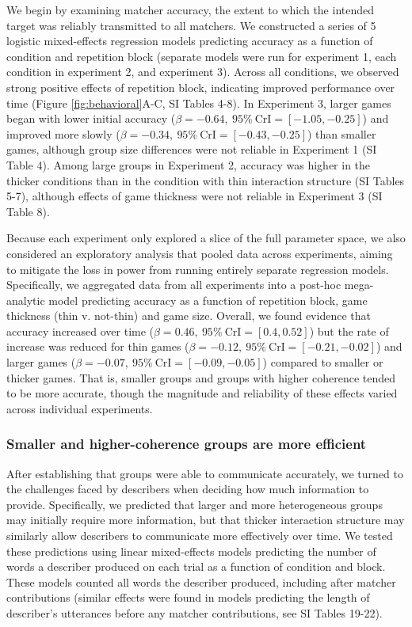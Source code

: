 \documentclass[
  english,
]{article}
\begin{document}
We begin by examining matcher accuracy, the extent to which the intended target was reliably transmitted to all matchers.
We constructed a series of 5 logistic mixed-effects regression models predicting accuracy as a function of condition and repetition block (separate models were run for experiment 1, each condition in experiment 2, and experiment 3).
Across all conditions, we observed strong positive effects of repetition block, indicating improved performance over time (Figure \ref{fig:behavioral}A-C, SI Tables 4-8).
In Experiment 3, larger games began with lower initial accuracy (\(\beta=-0.64,\:95\%\:\mathrm{CrI}=[-1.05, -0.25]\)) and improved more slowly (\(\beta=-0.34,\:95\%\:\mathrm{CrI}=[-0.43, -0.25]\)) than smaller games, although group size differences were not reliable in Experiment 1 (SI Table 4).
Among large groups in Experiment 2, accuracy was higher in the thicker conditions than in the condition with thin interaction structure (SI Tables 5-7), although effects of game thickness were not reliable in Experiment 3 (SI Table 8).

Because each experiment only explored a slice of the full parameter space, we also considered an exploratory analysis that pooled data across experiments, aiming to mitigate the loss in power from running entirely separate regression models.
Specifically, we aggregated data from all experiments into a post-hoc mega-analytic model predicting accuracy as a function of repetition block, game thickness (thin v. not-thin) and game size.
Overall, we found evidence that accuracy increased over time (\(\beta=0.46,\:95\%\:\mathrm{CrI}=[0.4, 0.52]\)) but the rate of increase was reduced for thin games (\(\beta=-0.12,\:95\%\:\mathrm{CrI}=[-0.21, -0.02]\)) and larger games (\(\beta=-0.07,\:95\%\:\mathrm{CrI}=[-0.09, -0.05]\)) compared to smaller or thicker games.
That is, smaller groups and groups with higher coherence tended to be more accurate, though the magnitude and reliability of these effects varied across individual experiments.

\subsubsection{Smaller and higher-coherence groups are more efficient}\label{smaller-and-higher-coherence-groups-are-more-efficient}

After establishing that groups were able to communicate accurately, we turned to the challenges faced by describers when deciding how much information to provide.
Specifically, we predicted that larger and more heterogeneous groups may initially require more information, but that thicker interaction structure may similarly allow describers to communicate more effectively over time.
We tested these predictions using linear mixed-effects models predicting the number of words a describer produced on each trial as a function of condition and block.
These models counted all words the describer produced, including after matcher contributions (similar effects were found in models predicting the length of describer's utterances before any matcher contributions, see SI Tables 19-22).
\end{document}
